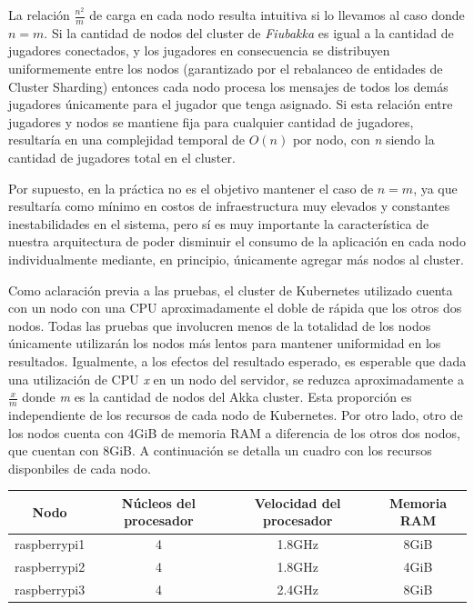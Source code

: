 La relación $\frac{n^2}{m}$ de carga en cada nodo resulta intuitiva si lo llevamos al caso donde $n = m$. Si la cantidad de nodos del cluster de \textit{Fiubakka} es igual a la cantidad de jugadores conectados,
y los jugadores en consecuencia se distribuyen uniformemente entre los nodos (garantizado por el rebalanceo de entidades de Cluster Sharding) entonces cada nodo procesa los mensajes de todos los demás jugadores
únicamente para el jugador que tenga asignado. Si esta relación entre jugadores y nodos se mantiene fija para cualquier cantidad de jugadores, resultaría en una complejidad temporal de $O(n)$ por nodo, con
\textit{n} siendo la cantidad de jugadores total en el cluster.

Por supuesto, en la práctica no es el objetivo mantener el caso de $n = m$, ya que resultaría como mínimo en costos de infraestructura muy elevados y constantes inestabilidades en el sistema, pero sí es muy importante la característica de nuestra arquitectura de poder
disminuir el consumo de la aplicación en cada nodo individualmente mediante, en principio, únicamente agregar más nodos al cluster.

Como aclaración previa a las pruebas, el cluster de Kubernetes utilizado cuenta con un nodo con una CPU aproximadamente el doble de rápida que los otros dos nodos.
Todas las pruebas que involucren menos de la totalidad de los nodos únicamente utilizarán los nodos más lentos para mantener uniformidad en los resultados.
Igualmente, a los efectos del resultado esperado, es esperable que dada una utilización de CPU \textit{x} en un nodo del servidor, se reduzca aproximadamente a
$\frac{x}{m}$ donde \textit{m} es la cantidad de nodos del Akka cluster. Esta proporción es independiente de los recursos de cada nodo de Kubernetes. Por otro lado,
otro de los nodos cuenta con 4GiB de memoria RAM a diferencia de los otros dos nodos, que cuentan con 8GiB. A continuación se detalla un cuadro con los recursos disponbiles
de cada nodo.

\begin{center}
\begin{tabular}{|c|c|c|c|}
    \hline
    \textbf{Nodo} & \textbf{Núcleos del procesador} & \textbf{Velocidad del procesador} & \textbf{Memoria RAM} \\
    \hline
    raspberrypi1 & 4 & 1.8GHz & 8GiB \\
    \hline
    raspberrypi2 & 4 & 1.8GHz & 4GiB \\
    \hline
    raspberrypi3 & 4 & 2.4GHz & 8GiB \\
    \hline
\end{tabular}
\end{center}

